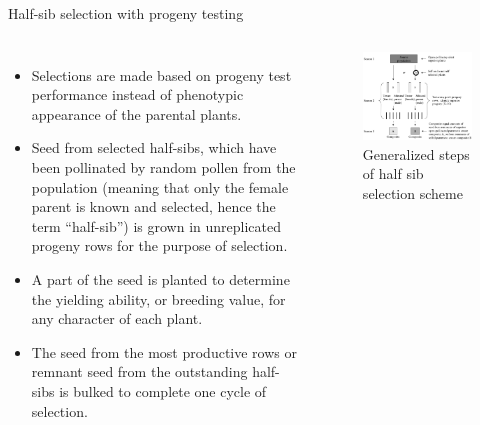 \documentclass[11pt,ignorenonframetext,aspectratio=169]{beamer}
\providecommand{\tightlist}{%
  \setlength{\itemsep}{0pt}\setlength{\parskip}{0pt}}
\newcommand{\bcolumns}{\begin{columns}[T, onlytextwidth]}
\newcommand{\ecolumns}{\end{columns}}
\begin{document}
\begin{frame}{Half-sib selection with progeny testing}
\protect\hypertarget{half-sib-selection-with-progeny-testing}{}
\bcolumns
{}
\small

\begin{itemize}
\tightlist
\item
  Selections are made based on progeny test performance instead of
  phenotypic appearance of the parental plants.
\item
  Seed from selected half-sibs, which have been pollinated by random
  pollen from the population (meaning that only the female parent is
  known and selected, hence the term ``half-sib'') is grown in
  unreplicated progeny rows for the purpose of selection.
\item
  A part of the seed is planted to determine the yielding ability, or
  breeding value, for any character of each plant.
\item
  The seed from the most productive rows or remnant seed from the
  outstanding half-sibs is bulked to complete one cycle of selection.
\end{itemize}


\begin{figure}

{\centering \includegraphics[width=0.88\linewidth]{./images/half_sib_selection} 

}

\caption{Generalized steps of half sib selection scheme}\label{fig:half-sib-selection}
\end{figure}

\ecolumns
\end{frame}
\end{document}
